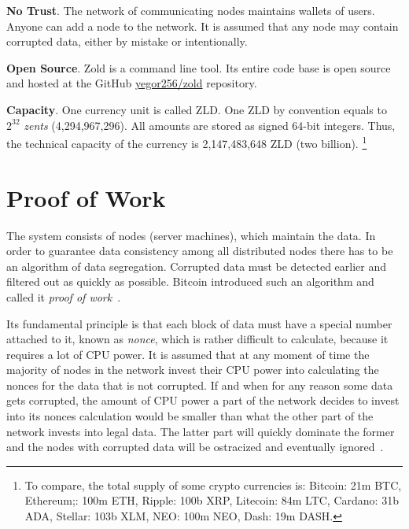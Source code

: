 \documentclass[11pt,oneside]{article}
\begin{document}
\textbf{No Trust}.
The network of communicating nodes maintains wallets of users.
Anyone can add a node to the network.
It is assumed that any node may contain corrupted data, either by mistake or intentionally.

\textbf{Open Source}.
Zold is a command line tool. Its entire code base is open source
and hosted at the GitHub \href{https://github.com/yegor256/zold}{yegor256/zold}
repository.

\textbf{Capacity}.
One currency unit is called ZLD.
One ZLD by convention equals to $2^{32}$ \emph{zents} (4,294,967,296).
All amounts are stored as signed 64-bit integers.
Thus, the technical capacity of the currency is 2,147,483,648 ZLD (two billion).%
\footnote{%
  To compare, the total supply of some crypto currencies is:
  Bitcoin: 21m BTC,
  Ethereum;: 100m ETH,
  Ripple: 100b XRP,
  Litecoin: 84m LTC,
  Cardano: 31b ADA,
  Stellar: 103b XLM,
  NEO: 100m NEO,
  Dash: 19m DASH.
}


\section{Proof of Work}

The system consists of nodes (server machines), which maintain the data.
In order to guarantee data consistency among all distributed nodes
there has to be an algorithm of data segregation.
Corrupted data must be detected earlier and filtered out as quickly as possible.
Bitcoin introduced such an algorithm and called it \emph{proof of work}~\parencite{nakamoto2008}.

Its fundamental principle is that each block of data must have a special
number attached to it, known as \emph{nonce}, which is rather difficult to calculate,
because it requires a lot of CPU power. It is assumed that at any moment
of time the majority of nodes in the network invest their CPU power into
calculating the nonces for the data that is not corrupted. If and when for any reason
some data gets corrupted, the amount of CPU power a part of the network
decides to invest into its nonces calculation would be smaller than what
the other part of the network invests into legal data. The latter part
will quickly dominate the former and the nodes with corrupted data will
be ostracized and eventually ignored~\parencite{nakamoto2008}.
\end{document}
